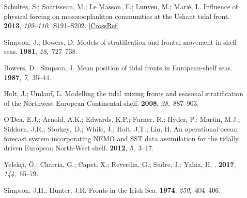 \documentclass[jmse,article,accept,moreauthors,pdftex]{Definitions/mdpi}
\begin{document}
\begin{thebibliography}{999}
Schultes, S.; Sourisseau, M.; {Le Masson}, E.; Lunven, M.; Marié, L.
\newblock Influence of physical forcing on mesozooplankton communities at the
Ushant tidal front.
 {\bf 2013}, {\em {109--110}},~S191--S202.
 [\href{http://dx.doi.org/10.1016/j.jmarsys.2011.11.025}{CrossRef}]

Simpson, J.; Bowers, D.
\newblock Models of stratification and frontal movement in shelf seas.
 {\bf
1981}, {\em 28},~727--738.

Bowers, D.; Simpson, J.
\newblock Mean position of tidal fronts in European-shelf seas.
 {\bf 1987}, {\em 7},~35--44.

Holt, J.; Umlauf, L.
\newblock Modelling the tidal mixing fronts and seasonal stratification of the
Northwest European Continental shelf.
 {\bf 2008}, {\em 28},~887--903.

O’Dea, E.J.; Arnold, A.K.; Edwards, K.P.; Furner, R.; Hyder, P.; Martin,
M.J.; Siddorn, J.R.; Storkey,~D.; While, J.; Holt, J.T.; Liu, H.
\newblock An operational ocean forecast system incorporating NEMO and SST data
assimilation for the tidally driven European North-West shelf.
 {\bf 2012}, {\em 5},~3--17.

Yelek{\c{c}}i, {\"{O}}.; Charria, G.; Capet, X.; Reverdin, G.; Sudre, J.;
Yahia, H.
.
 {\bf 2017}, {\em 144},~65--79.

Simpson, J.H.; Hunter, J.R.
\newblock Fronts in the Irish Sea.
 {\bf 1974}, {\em 250},~404--406.


\end{thebibliography}
\end{document}
